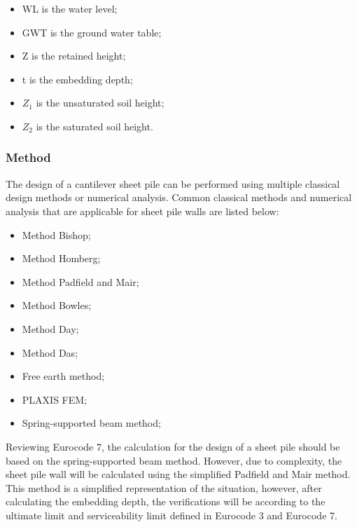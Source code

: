 \begin{itemize}
    \item WL is the water level;
    \item GWT is the ground water table;
    \item Z is the retained height;
    \item t is the embedding depth;
    \item $Z_{1}$ is the unsaturated soil height;
    \item $Z_{2}$ is the saturated soil height.
\end{itemize}

\subsubsection{Method}

The design of a cantilever sheet pile can be performed using multiple classical design methods or numerical analysis. Common classical methods and numerical analysis that are applicable for sheet pile walls are listed below:

\begin{itemize}
  \item Method Bishop;
  \item Method Homberg;
  \item Method Padfield and Mair;
  \item Method Bowles;
  \item Method Day;
  \item Method Das;
  \item Free earth method;
  \item PLAXIS FEM;
  \item Spring-supported beam method;
\end{itemize}

Reviewing Eurocode 7, the calculation for the design of a sheet pile should be based on the spring-supported beam method. However, due to complexity, the sheet pile wall will be calculated using the simplified Padfield and Mair method. This method is a simplified representation of the situation, however, after calculating the embedding depth, the verifications will be according to the ultimate limit and serviceability limit defined in Eurocode 3 and Eurocode 7.


